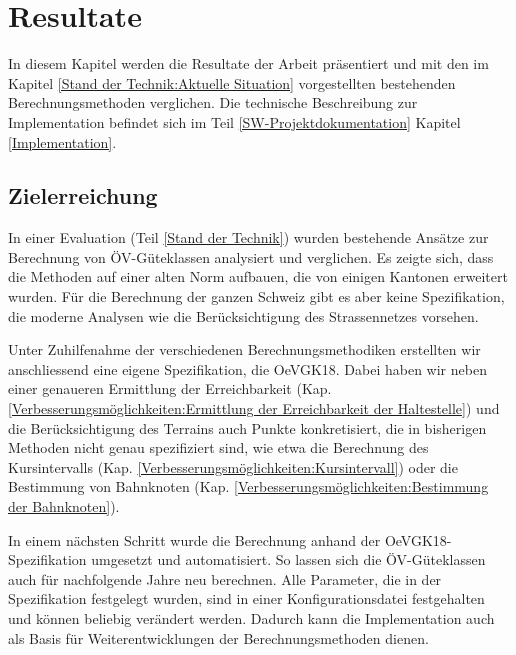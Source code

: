 
\section{Resultate}
\label{Resultate}

In diesem Kapitel werden die Resultate der Arbeit präsentiert und mit den im Kapitel \ref{Stand der Technik:Aktuelle Situation} vorgestellten bestehenden Berechnungsmethoden verglichen.
Die technische Beschreibung zur Implementation befindet sich im Teil \ref{SW-Projektdokumentation} Kapitel \ref{Implementation}.

\subsection{Zielerreichung}
\label{Resultate:Zielerreichung}

In einer Evaluation (Teil \ref{Stand der Technik}) wurden bestehende Ansätze zur Berechnung von \gls{ÖV-Güteklassen} analysiert und verglichen.
Es zeigte sich, dass die Methoden auf einer alten Norm aufbauen, die von einigen Kantonen erweitert wurden.
Für die Berechnung der ganzen Schweiz gibt es aber keine Spezifikation, die moderne Analysen wie die Berücksichtigung des Strassennetzes vorsehen.

Unter Zuhilfenahme der verschiedenen Berechnungsmethodiken erstellten wir anschliessend eine eigene Spezifikation, die \gls{OeVGK18}.
Dabei haben wir neben einer genaueren Ermittlung der Erreichbarkeit (Kap. \ref{Verbesserungsmöglichkeiten:Ermittlung der Erreichbarkeit der Haltestelle}) und die Berücksichtigung des Terrains auch Punkte konkretisiert, die in bisherigen Methoden nicht genau spezifiziert sind, wie etwa die Berechnung des Kursintervalls (Kap. \ref{Verbesserungsmöglichkeiten:Kursintervall}) oder die Bestimmung von Bahnknoten (Kap. \ref{Verbesserungsmöglichkeiten:Bestimmung der Bahnknoten}).

In einem nächsten Schritt wurde die Berechnung anhand der \gls{OeVGK18}-Spezifikation umgesetzt und automatisiert.
So lassen sich die \gls{ÖV-Güteklassen} auch für nachfolgende Jahre neu berechnen.
Alle Parameter, die in der Spezifikation festgelegt wurden, sind in einer Konfigurationsdatei festgehalten und können beliebig verändert werden.
Dadurch kann die Implementation auch als Basis für Weiterentwicklungen der Berechnungsmethoden dienen.

